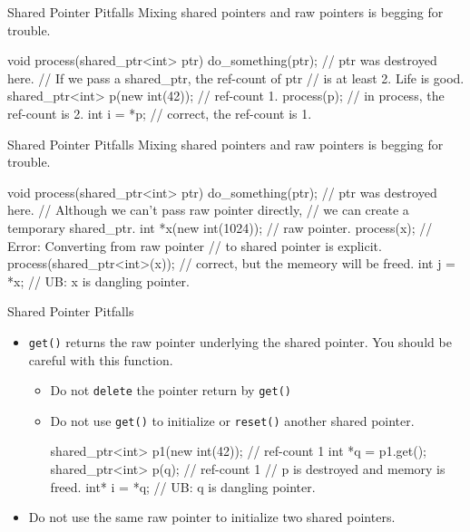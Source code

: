 \begin{frame}[fragile]{Shared Pointer Pitfalls}
  Mixing shared pointers and raw pointers is begging for trouble.
  \begin{cpp}
void process(shared_ptr<int> ptr) {
  do_something(ptr);
} // ptr was destroyed here.
// If we pass a shared_ptr, the ref-count of ptr 
// is at least 2. Life is good.
shared_ptr<int> p(new int(42)); // ref-count 1.
process(p); // in process, the ref-count is 2.
int i = *p; // correct, the ref-count is 1.
  \end{cpp}
\end{frame}
\begin{frame}[fragile]{Shared Pointer Pitfalls}
  Mixing shared pointers and raw pointers is begging for trouble.
  \begin{cpp}
void process(shared_ptr<int> ptr) {
  do_something(ptr);
} // ptr was destroyed here.
// Although we can't pass raw pointer directly, 
// we can create a temporary shared_ptr.
int *x(new int(1024)); // raw pointer.
process(x); // Error: Converting from raw pointer 
            // to shared pointer is explicit.
process(shared_ptr<int>(x)); 
// correct, but the memeory will be freed.
int j = *x; // UB: x is dangling pointer.
  \end{cpp}
\end{frame}
\begin{frame}[fragile]{Shared Pointer Pitfalls}
\begin{itemize}
  \item \texttt{get()} returns the raw pointer underlying the shared pointer. You should be careful with this function.
  \begin{itemize}
    \item Do not \texttt{delete} the pointer return by \texttt{get()}
    \item Do not use \texttt{get()} to initialize or \texttt{reset()} another shared pointer.
    \begin{cpp}
shared_ptr<int> p1(new int(42)); // ref-count 1
int *q = p1.get(); 
{
  shared_ptr<int> p(q); // ref-count 1
} // p is destroyed and memory is freed.
int* i = *q; // UB: q is dangling pointer.
    \end{cpp}\pause
  \end{itemize}
  \item Do not use the same raw pointer to initialize two shared pointers.
\end{itemize}
\end{frame}

